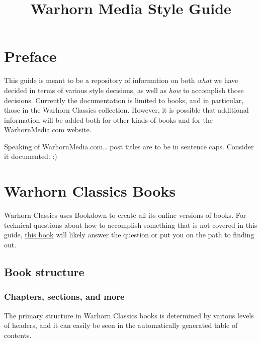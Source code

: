 \documentclass[
]{book}
\title{Warhorn Media Style Guide}
\author{}
\date{\vspace{-2.5em}}
\begin{document}
\maketitle

\mainmatter

{
\setcounter{tocdepth}{1}
\tableofcontents
}
\hypertarget{preface}{%
\chapter*{Preface}\label{preface}}

This guide is meant to be a repository of information on both \emph{what} we have decided in terms of various style decisions, as well as \emph{how} to accomplish those decisions. Currently the documentation is limited to books, and in particular, those in the Warhorn Classics collection. However, it is possible that additional information will be added both for other kinds of books and for the WarhornMedia.com website.

Speaking of WarhornMedia.com\ldots{} post titles are to be in sentence caps. Consider it documented. :)

\hypertarget{warhorn-classics-books}{%
\chapter{Warhorn Classics Books}\label{warhorn-classics-books}}

Warhorn Classics uses Bookdown to create all its online versions of books. For technical questions about how to accomplish something that is not covered in this guide, \href{https://bookdown.org/yihui/bookdown/}{this book} will likely answer the question or put you on the path to finding out.

\hypertarget{book-structure}{%
\section{Book structure}\label{book-structure}}

\hypertarget{chapters-sections-and-more}{%
\subsection{Chapters, sections, and more}\label{chapters-sections-and-more}}

The primary structure in Warhorn Classics books is determined by various levels of headers, and it can easily be seen in the automatically generated table of contents.
\end{document}
